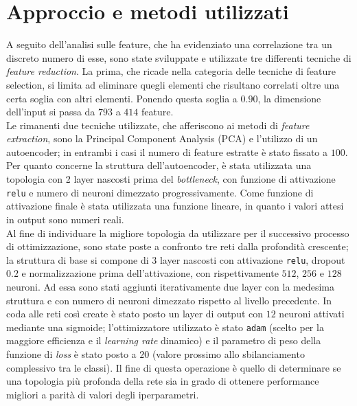\section{Approccio e metodi utilizzati}
A seguito dell'analisi sulle feature, che ha evidenziato una correlazione tra un discreto numero di esse, sono state sviluppate e utilizzate tre differenti tecniche di \textit{feature reduction}. La prima, che ricade nella categoria delle tecniche di feature selection, si limita ad eliminare quegli elementi che risultano correlati oltre una certa soglia con altri elementi. Ponendo questa soglia a $0.90$, la dimensione dell'input si passa da $793$ a $414$ feature.\\
Le rimanenti due tecniche utilizzate, che afferiscono ai metodi di \textit{feature extraction}, sono la Principal Component Analysis (PCA) e l'utilizzo di un autoencoder; in entrambi i casi il numero di feature estratte è stato fissato a $100$.
Per quanto concerne la struttura dell'autoencoder, è stata utilizzata una topologia con 2 layer nascosti prima del \textit{bottleneck}, con funzione di attivazione \texttt{relu} e numero di neuroni dimezzato progressivamente. Come funzione di attivazione finale è stata utilizzata una funzione lineare, in quanto i valori attesi in output sono numeri reali.\\
Al fine di individuare la migliore topologia da utilizzare per il successivo processo di ottimizzazione, sono state poste a confronto tre reti dalla profondità crescente; la struttura di base si compone di $3$ layer nascosti con attivazione \texttt{relu}, dropout $0.2$ e normalizzazione prima dell'attivazione, con rispettivamente $512$, $256$ e $128$ neuroni. Ad essa sono stati aggiunti iterativamente due layer con la medesima struttura e con numero di neuroni dimezzato rispetto al livello precedente. In coda alle reti così create è stato posto un layer di output con $12$ neuroni attivati mediante una sigmoide; l'ottimizzatore utilizzato è stato \texttt{adam} (scelto per la maggiore efficienza e il \textit{learning rate} dinamico) e il parametro di peso della funzione di \textit{loss} è stato posto a $20$ (valore prossimo allo sbilanciamento complessivo tra le classi). Il fine di questa operazione è quello di determinare se una topologia più profonda della rete  sia in grado di ottenere performance migliori a parità di valori degli iperparametri.\\

